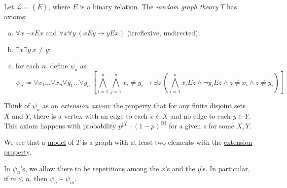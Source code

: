 \begin{definition}\label{def:random-graph-theory}
	Let \(\mathcal{L} = \left\{ E \right\} \), where \(E\) is a binary relation. The \emph{random graph theory} \(T\) has axioms:
	\begin{enumerate}[(a)]
		\item\label{def:random-graph-theory-a} \(\forall x\ \lnot xEx\) and \(\forall x \forall y\ (xEy \to yEx)\) (irreflexive, undirected);
		\item\label{def:random-graph-theory-b} \(\exists x \exists y\ x \neq y\);
		\item for each \(n\), define \(\psi _n\) as
		      \[
			      \psi _n \coloneqq \forall x_1 \ldots \forall x_n \forall y_1 \ldots \forall y_n\ \left[ \bigwedge_{i=1}^{n} \bigwedge_{j=1}^{n} x_i \neq y_i \to \exists z\ \left( \bigwedge_{i=1}^{n} x_i E z \land \lnot y_i E z \land z \neq x_i \land z \neq y_i \right) \right]
		      \]
	\end{enumerate}
\end{definition}

\begin{intuition}\label{int:extension-axiom}
	Think of \(\psi _n\) as an \emph{extension axiom}: the property that for any finite disjoint sets \(X\) and \(Y\), there is a vertex with an edge to each \(x\in X\) and no edge to each \(y\in Y\). This axiom happens with probability \(p^{\vert X \vert } \cdot (1 - p) ^{\vert Y \vert }\) for a given \(z\) for some \(X, Y\).
\end{intuition}

We see that a \hyperref[def:model]{model} of \(T\) is a graph with at least two elements with the \hyperref[int:extension-axiom]{extension property}.

\begin{center}
\end{center}

\begin{note}
	In \(\psi _n\)'s, we allow there to be repetitions among the \(x\)'s and the \(y\)'s. In particular, if \(m \leq n\), then \(\psi _n \models \psi _m\).
\end{note}